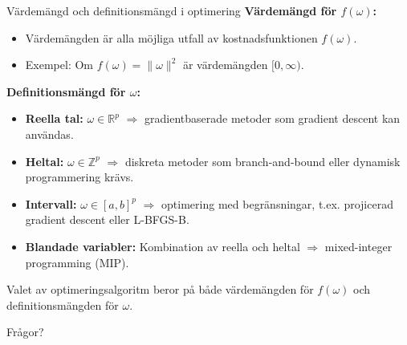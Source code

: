 \documentclass[10pt,english]{beamer}
\begin{document}
\begin{frame}{Värdemängd och definitionsmängd i optimering}
    \textbf{Värdemängd för $f(\omega)$:}
    \begin{itemize}
        \item Värdemängden är alla möjliga utfall av kostnadsfunktionen $f(\omega)$.
        \item Exempel: Om $f(\omega) = \|\omega\|^2$ är värdemängden $[0, \infty)$.
    \end{itemize}

    \vspace{0.2cm}
    \textbf{Definitionsmängd för $\omega$:}
    \begin{itemize}
        \item \textbf{Reella tal:} $\omega \in \mathbb{R}^p$ $\Rightarrow$ gradientbaserade metoder som gradient descent kan användas.
        \item \textbf{Heltal:} $\omega \in \mathbb{Z}^p$ $\Rightarrow$ diskreta metoder som branch-and-bound eller dynamisk programmering krävs.
        \item \textbf{Intervall:} $\omega \in [a, b]^p$ $\Rightarrow$ optimering med begränsningar, t.ex. projicerad gradient descent eller L-BFGS-B.
        \item \textbf{Blandade variabler:} Kombination av reella och heltal $\Rightarrow$ mixed-integer programming (MIP).
    \end{itemize}

    Valet av optimeringsalgoritm beror på både värdemängden för $f(\omega)$ och definitionsmängden för $\omega$.
\end{frame}



\begin{frame}{Frågor?}
    
\end{frame}
\end{document}
